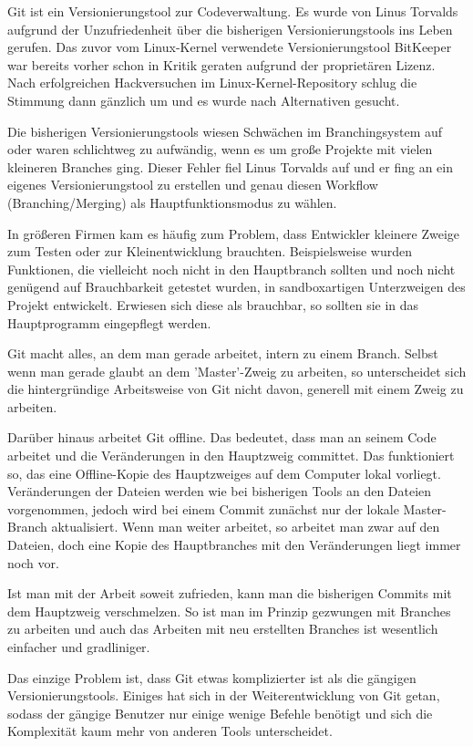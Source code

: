 Git ist ein Versionierungstool zur Codeverwaltung. Es wurde von Linus Torvalds aufgrund der Unzufriedenheit über die bisherigen Versionierungstools ins Leben gerufen. Das zuvor vom Linux-Kernel verwendete Versionierungstool BitKeeper war bereits vorher schon in Kritik geraten aufgrund der proprietären Lizenz. Nach erfolgreichen Hackversuchen im Linux-Kernel-Repository schlug die Stimmung dann gänzlich um und es wurde nach Alternativen gesucht.

Die bisherigen Versionierungstools wiesen Schwächen im Branchingsystem auf oder waren schlichtweg zu aufwändig, wenn es um große Projekte mit vielen kleineren Branches ging. Dieser Fehler fiel Linus Torvalds auf und er fing an ein eigenes Versionierungstool zu erstellen und genau diesen Workflow (Branching/Merging) als Hauptfunktionsmodus zu wählen.

In größeren Firmen kam es häufig zum Problem, dass Entwickler kleinere Zweige zum Testen oder zur Kleinentwicklung brauchten. Beispielsweise wurden Funktionen, die vielleicht noch nicht in den Hauptbranch sollten und noch nicht genügend auf Brauchbarkeit getestet wurden, in sandboxartigen Unterzweigen des Projekt entwickelt. Erwiesen sich diese als brauchbar, so sollten sie in das Hauptprogramm eingepflegt werden.

Git macht alles, an dem man gerade arbeitet, intern zu einem Branch.
Selbst wenn man gerade glaubt an dem 'Master'-Zweig zu arbeiten, so unterscheidet sich die hintergründige Arbeitsweise von Git nicht davon, generell mit einem Zweig zu arbeiten.

Darüber hinaus arbeitet Git offline. Das bedeutet, dass man an seinem Code arbeitet und die Veränderungen in den Hauptzweig committet.
Das funktioniert so, das eine Offline-Kopie des Hauptzweiges auf dem Computer lokal vorliegt.
Veränderungen der Dateien werden wie bei bisherigen Tools an den Dateien vorgenommen, jedoch wird bei einem Commit zunächst nur der lokale Master-Branch aktualisiert.
Wenn man weiter arbeitet, so arbeitet man zwar auf den Dateien, doch eine Kopie des Hauptbranches mit den Veränderungen liegt immer noch vor.

Ist man mit der Arbeit soweit zufrieden, kann man die bisherigen Commits mit dem Hauptzweig verschmelzen.
So ist man im Prinzip gezwungen mit Branches zu arbeiten %
 und auch das Arbeiten mit neu erstellten Branches ist wesentlich einfacher und gradliniger.

Das einzige Problem ist, dass Git etwas komplizierter ist als die gängigen Versionierungstools.
Einiges hat sich in der Weiterentwicklung von Git getan, sodass der gängige Benutzer nur einige wenige Befehle benötigt und sich die Komplexität kaum mehr von anderen Tools unterscheidet.

